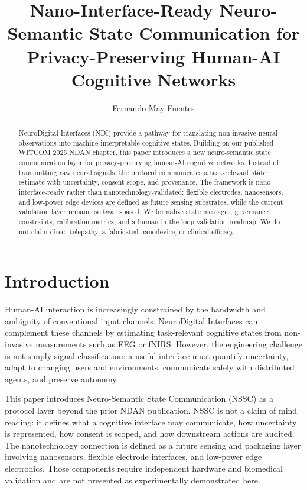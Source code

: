 \documentclass[sigconf]{acmart}
\title{Nano-Interface-Ready Neuro-Semantic State Communication for Privacy-Preserving Human-AI Cognitive Networks}
\author{Fernando May Fuentes}
\affiliation{\institution{Instituto Polit\'{e}cnico Nacional, UPIITA}\city{Mexico City}\country{Mexico}}
\affiliation{\institution{Beihang University, School of Information and Communication Engineering}\city{Beijing}\country{China}}
\begin{document}
\begin{abstract}
NeuroDigital Interfaces (NDI) provide a pathway for translating non-invasive neural observations into machine-interpretable cognitive states. Building on our published WITCOM 2025 NDAN chapter, this paper introduces a new neuro-semantic state communication layer for privacy-preserving human-AI cognitive networks. Instead of transmitting raw neural signals, the protocol communicates a task-relevant state estimate with uncertainty, consent scope, and provenance. The framework is nano-interface-ready rather than nanotechnology-validated: flexible electrodes, nanosensors, and low-power edge devices are defined as future sensing substrates, while the current validation layer remains software-based. We formalize state messages, governance constraints, calibration metrics, and a human-in-the-loop validation roadmap. We do not claim direct telepathy, a fabricated nanodevice, or clinical efficacy.
\end{abstract}
\maketitle

\section{Introduction}
Human-AI interaction is increasingly constrained by the bandwidth and ambiguity of conventional input channels. NeuroDigital Interfaces can complement these channels by estimating task-relevant cognitive states from non-invasive measurements such as EEG or fNIRS. However, the engineering challenge is not simply signal classification: a useful interface must quantify uncertainty, adapt to changing users and environments, communicate safely with distributed agents, and preserve autonomy.

This paper introduces Neuro-Semantic State Communication (NSSC) as a protocol layer beyond the prior NDAN publication. NSSC is not a claim of mind reading: it defines what a cognitive interface may communicate, how uncertainty is represented, how consent is scoped, and how downstream actions are audited. The nanotechnology connection is defined as a future sensing and packaging layer involving nanosensors, flexible electrode interfaces, and low-power edge electronics. Those components require independent hardware and biomedical validation and are not presented as experimentally demonstrated here.
\end{document}
